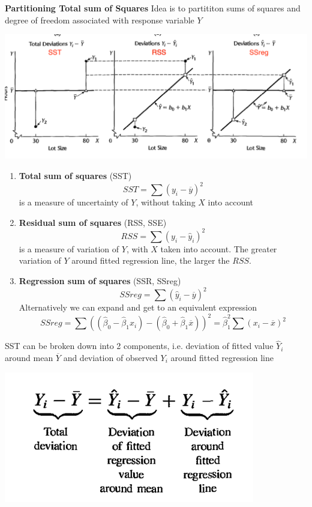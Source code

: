 \documentclass[11pt]{article}
\begin{document}
\begin{defn*}
	\textbf{Partitioning Total sum of Squares} Idea is to partititon sums of squares and degree of freedom associated with response variable $Y$\\
	\begin{center}
		\includegraphics[width=\textwidth]{anova_simple_reg}
	\end{center}
	\begin{enumerate}
		\item \textbf{Total sum of squares} (SST) 
		\[
			SST = \sum (y_i - \overline{y})^2
		\]
		is a measure of uncertainty of $Y$, without taking $X$ into account
		\item \textbf{Residual sum of squares} (RSS, SSE)
		\[
			RSS = \sum (y_i - \hat{y}_i)^2
		\]
		is a measure of variation of $Y$, with $X$ taken into account. The greater variation of $Y$ around fitted regression line, the larger the $RSS$. 
		\item \textbf{Regression sum of squares} (SSR, SSreg)
		\[
			SSreg = \sum (\hat{y}_i - \overline{y})^2
		\]
		Alternatively we can expand and get to an equivalent expression 
		\[
			SSreg = \sum ((\hat{\beta}_0 - \hat{\beta}_1x_i) - (\hat{\beta}_0 + \hat{\beta}_1 \overline{x}))^2 
			= \hat{\beta}_1^2 \sum (x_i - \overline{x})^2
		\]
	\end{enumerate}
	SST can be broken down into 2 components, i.e. deviation of fitted value $\hat{Y}_i$ around mean $\overline{Y}$ and deviation of observed $Y_i$ around fitted regression line
	\begin{center}
		\includegraphics[width=\textwidth/2]{anova_partitioning}

\end{center}
\end{defn*}
\end{document}
